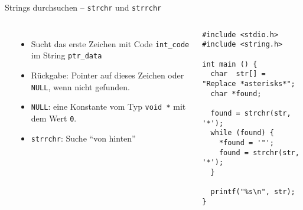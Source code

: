 
\begin{frame}[fragile]{Strings durchsuchen -- \texttt{strchr} und \texttt{strrchr}}
%
\vspace{-15pt}
\begin{columns}[T]
\begin{codebox}[Syntax]
\footnotesize{}\newline
\footnotesize{}
\end{codebox}
%
\begin{itemize}
\item Sucht das erste Zeichen mit Code \texttt{int\_code} im String \texttt{ptr\_data}
\item Rückgabe: Pointer auf dieses Zeichen oder \texttt{NULL}, wenn nicht gefunden.
\item \texttt{NULL}: eine Konstante vom Typ \texttt{void *} mit dem Wert \texttt{0}.
\item \texttt{strrchr}: Suche \enquote{von hinten}
\end{itemize}
%
\begin{codebox}[Beispiel]
\begin{verbatim}
#include <stdio.h>
#include <string.h>

int main () {
  char  str[] = "Replace *asterisks*";
  char *found;   
   
  found = strchr(str, '*');
  while (found) {
    *found = '"';
    found = strchr(str, '*');
  }
  
  printf("%s\n", str);
}
\end{verbatim}
\end{codebox}
%
\end{columns}
%
\end{frame}


